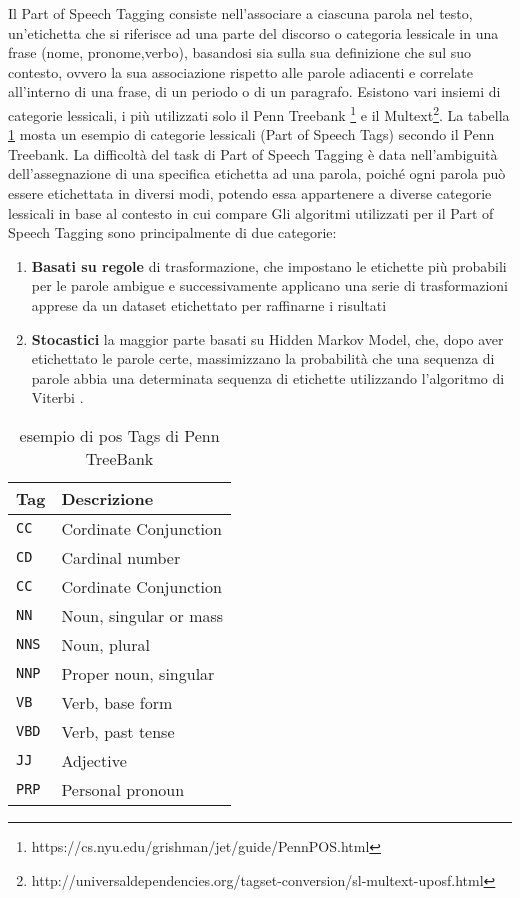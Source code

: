 Il Part of Speech Tagging consiste nell'associare a ciascuna parola nel testo, un'etichetta che si riferisce ad una parte del discorso o categoria lessicale in una frase (nome, pronome,verbo), basandosi sia sulla sua definizione che sul  suo contesto, ovvero la sua associazione rispetto alle parole adiacenti e correlate all'interno di una frase, di un periodo o di un paragrafo.
Esistono vari insiemi di categorie lessicali, i più utilizzati solo il Penn Treebank \footnote{https://cs.nyu.edu/grishman/jet/guide/PennPOS.html} e il Multext\footnote{http://universaldependencies.org/tagset-conversion/sl-multext-uposf.html}.
La tabella \ref{tab:PosTags} mosta un esempio di categorie lessicali (Part of Speech Tags) secondo il Penn Treebank.
La difficoltà del task di Part of Speech Tagging è data nell'ambiguità dell'assegnazione di una specifica etichetta ad una parola, poiché ogni parola può essere
etichettata in diversi modi, potendo essa appartenere a diverse categorie lessicali in base al contesto in cui compare 
Gli algoritmi utilizzati per il Part of Speech Tagging sono principalmente di due
categorie:
\begin{enumerate}
\item \textbf{Basati su regole}  di trasformazione, che impostano le etichette più probabili
per le parole ambigue e successivamente applicano una serie di trasformazioni
apprese da un dataset etichettato per raffinarne i risultati 
\item \textbf{Stocastici} la maggior parte basati su Hidden Markov Model,
che, dopo aver etichettato le parole certe, massimizzano la probabilità che una sequenza di parole abbia una determinata sequenza di etichette utilizzando l'algoritmo di Viterbi \cite{Ryan:1993:VA:901051}.
\end{enumerate}
\begin{table}[]
\centering
\caption{esempio di pos Tags di Penn TreeBank}
\label{tab:PosTags}
\begin{tabular}{ll}
\hline
 \textbf{Tag}& \textbf{Descrizione}\\ \hline
\texttt{CC}  & {Cordinate Conjunction}  \\ \hline
\texttt{CD}  & {Cardinal number}  \\ \hline
\texttt{CC}  & {Cordinate Conjunction}  \\ \hline
\texttt{NN}  & {Noun, singular or mass}  \\ \hline
\texttt{NNS}  & {Noun, plural}  \\ \hline
\texttt{NNP}  & {Proper noun, singular}  \\ \hline
\texttt{VB}  & {Verb, base form}  \\ \hline
\texttt{VBD}  & {Verb, past tense}  \\ \hline
\texttt{JJ}  & {Adjective}  \\ \hline
\texttt{PRP}  & {Personal pronoun}  \\ \hline
\end{tabular}
\end{table}
